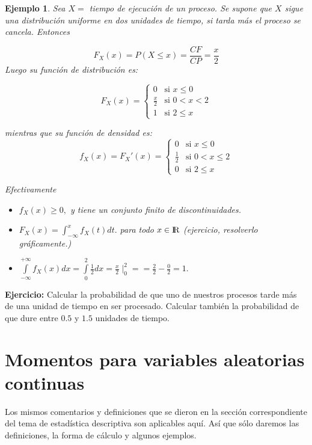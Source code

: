 \documentclass[12pt]{report}
\newtheorem{example}[definition]{Ejemplo}
\begin{document}
        \begin{example}
            Sea $X=$ tiempo de ejecución de un proceso. Se supone que $X$
             sigue una distribución uniforme en dos unidades de tiempo,
             si tarda más el proceso se cancela. Entonces

        $$F_{X}(x)=P(X\leq x)=\frac{CF}{CP}=\frac{x}{2}$$
        Luego su función de distribución es:



            $$F_{X}(x)=\left\{\begin{array}{ll}
        0 & \mbox{si } x\leq 0\\
        \frac{x}{2} & \mbox{si } 0<x<2\\
        1 & \mbox{si } 2\leq x
        \end{array}\right.$$

        mientras que su función de densidad es:
            $$f_{X}(x)=F_{X}'(x)=\left\{\begin{array}{ll}
        0 & \mbox{si } x\leq 0\\
        \frac{1}{2} & \mbox{si } 0<x\leq 2\\
        0 & \mbox{si } 2\leq x
        \end{array}\right.$$

                Efectivamente
\begin{itemize}
                \item $f_{X}(x)\geq 0,$ y tiene un conjunto finito de discontinuidades.
                \item $F_X(x)=\int_{-\infty}^x f_X(t) dt.$ para todo $x\in \mbox{I\kern-.2em\hbox{R}}$ (ejercicio,
                resolverlo gráficamente.)
                \item $\int\limits_{-\infty}^{+\infty}f_{X}(x)dx=
                \int\limits_{0}^{2}\frac{1}{2}dx=\frac{x}{2}\mid_{0}^{2}=
                =\frac{2}{2}-\frac{0}{2}=1.$
\end{itemize}
\end{example}

        \textbf{Ejercicio:} Calcular la probabilidad de que uno de nuestros procesos tarde
        más de una unidad de tiempo en ser procesado. Calcular también la  probabilidad de
         que dure entre $0.5$ y $1.5$ unidades de tiempo.

         \section{Momentos para variables aleatorias continuas}
Los mismos comentarios y definiciones que se dieron en la sección correspondiente del tema
de estadística descriptiva %
 son aplicables aquí. Así que sólo daremos las
definiciones, la forma de cálculo y algunos ejemplos.
\end{document}
